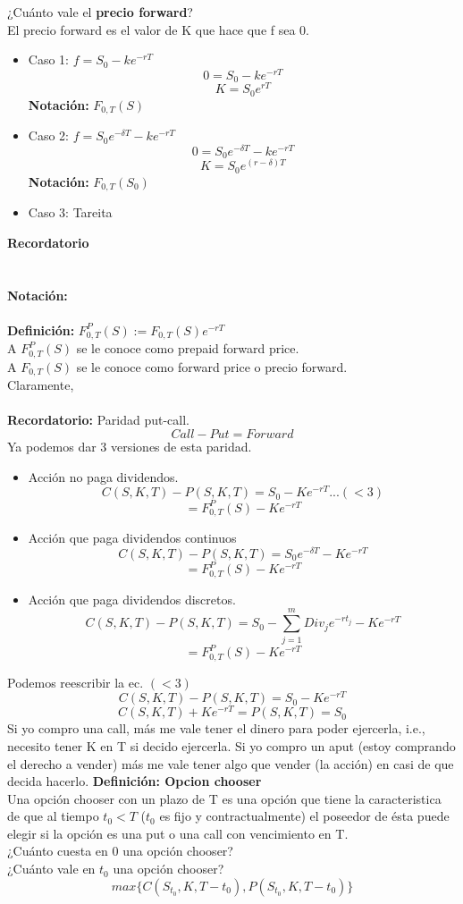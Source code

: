 \documentclass[12pts]{extarticle}
\begin{document}
¿Cuánto vale el \textbf{precio forward}? \\
El precio forward es el valor de K que hace que f sea 0.
\begin{itemize}
\item Caso 1: $f=S_0-ke^{-rT}$
$$0=S_0-ke^{-rT}$$
$$K=S_0e^{rT}$$ 
\textbf{Notación:} $F_{0,T}(S)$
\item Caso 2:  $f=S_0e^{-\delta T}-ke^{-rT}$
$$0=S_0e^{-\delta T}-ke^{-rT}$$
$$K=S_0e^{(r-\delta)T}$$ 
\textbf{Notación:} $F_{0,T}(S_0)$
\item Caso 3: Tareita

\end{itemize} 
\textbf{Recordatorio} \\
\\ \\ 
\textbf{Notación:}
\\ \\ 
\textbf{Definición:} $F_{0,T}^P (S):=F_{0,T}(S)e^{-rT}$ \\
A $F_{0,T}^P (S)$ se le conoce como prepaid forward price. \\
A $F_{0,T}(S)$ se le conoce como forward price o precio forward. \\
Claramente, 
\\ \\ 
 
\textbf{Recordatorio:} Paridad put-call. 
$$Call-Put=Forward$$
Ya podemos dar 3 versiones de esta paridad. 
 \begin{itemize}
\item Acción no paga dividendos. 
$$C(S,K,T)-P(S,K,T)=S_0-Ke^{-rT} ... (<3)$$
$$=F_{0,T}^{P} (S)-Ke^{-rT}$$
\item Acción que paga dividendos continuos
$$C(S,K,T)-P(S,K,T)=S_0e^{-\delta T}-Ke^{-rT}$$
$$=F_{0,T}^{P} (S)-Ke^{-rT}$$
\item Acción que paga dividendos discretos.
$$C(S,K,T)-P(S,K,T)=S_0-\sum_{j=1}^{m} Div_j e^{-rt_j}-Ke^{-rT}$$
$$=F_{0,T}^{P} (S)-Ke^{-rT}$$
\end{itemize}
Podemos reescribir la ec. $(<3)$
$$C(S,K,T)-P(S,K,T)=S_0-Ke^{-rT}$$
$$C(S,K,T)+Ke^{-rT}=P(S,K,T)=S_0$$
Si yo compro una call, más me vale tener el dinero para poder ejercerla, i.e., necesito tener K en T si decido ejercerla. Si yo compro un aput (estoy comprando el derecho a vender) más me vale tener algo que vender (la acción) en casi de que decida hacerlo. 
\newpage 
\textbf{Definición: Opcion chooser} \\
Una opción chooser con un plazo de T es una opción que tiene la caracteristica de que al tiempo $t_0<T$ ($t_0$ es fijo y contractualmente) el poseedor de ésta puede elegir si la opción es una put o una call con vencimiento en T. 
\\
¿Cuánto cuesta en 0 una opción chooser?
\\
¿Cuánto vale en $t_0$ una opción chooser? 
$$max\{C(S_{t_0},K,T-t_0), P(S_{t_0}, K, T-t_0)\}$$ 
\end{document}
